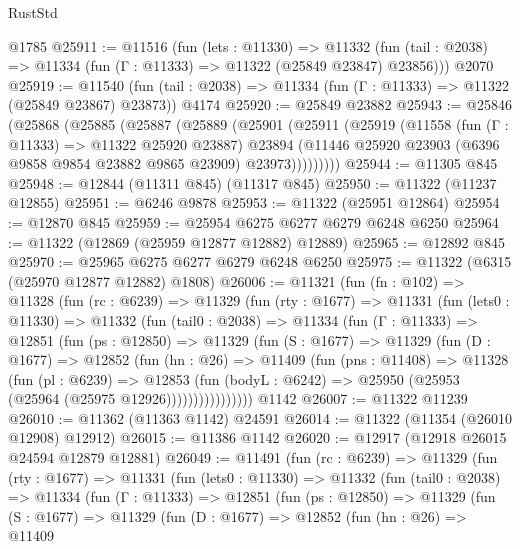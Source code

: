 \begin{lexlean}{RustStd}
\begin{coremodule}
    @1785
@25911 := @11516
    (fun (lets : @11330) =>
    @11332 (fun (tail : @2038) => @11334 (fun (Γ : @11333) => @11322 (@25849 @23847) @23856)))
    @2070
@25919 := @11540
    (fun (tail : @2038) => @11334 (fun (Γ : @11333) => @11322 (@25849 @23867) @23873))
    @4174
@25920 := @25849 @23882
@25943 := @25846
    (@25868
      (@25885
        (@25887
          (@25889
            (@25901
              (@25911
                (@25919
                  (@11558
                    (fun (Γ : @11333) => @11322 @25920 @23887)
                    @23894
                    (@11446 @25920 @23903 (@6396 @9858 @9854 @23882 @9865 @23909) @23973)))))))))
@25944 := @11305 @845
@25948 := @12844 (@11311 @845) (@11317 @845)
@25950 := @11322 (@11237 @12855)
@25951 := @6246 @9878
@25953 := @11322 (@25951 @12864)
@25954 := @12870 @845
@25959 := @25954 @6275 @6277 @6279 @6248 @6250
@25964 := @11322 (@12869 (@25959 @12877 @12882) @12889)
@25965 := @12892 @845
@25970 := @25965 @6275 @6277 @6279 @6248 @6250
@25975 := @11322 (@6315 (@25970 @12877 @12882) @1808)
@26006 := @11321
    (fun (fn : @102) =>
    @11328
      (fun (rc : @6239) =>
      @11329
        (fun (rty : @1677) =>
        @11331
          (fun (lets0 : @11330) =>
          @11332
            (fun (tail0 : @2038) =>
            @11334
              (fun (Γ : @11333) =>
              @12851
                (fun (ps : @12850) =>
                @11329
                  (fun (S : @1677) =>
                  @11329
                    (fun (D : @1677) =>
                    @12852
                      (fun (hn : @26) =>
                      @11409
                        (fun (pns : @11408) =>
                        @11328
                          (fun (pl : @6239) =>
                          @12853
                            (fun (bodyL : @6242) =>
                            @25950 (@25953 (@25964 (@25975 @12926))))))))))))))))
    @1142
@26007 := @11322 @11239
@26010 := @11362 (@11363 @1142) @24591
@26014 := @11322 (@11354 (@26010 @12908) @12912)
@26015 := @11386 @1142
@26020 := @12917 (@12918 @26015 @24594 @12879 @12881)
@26049 := @11491
    (fun (rc : @6239) =>
    @11329
      (fun (rty : @1677) =>
      @11331
        (fun (lets0 : @11330) =>
        @11332
          (fun (tail0 : @2038) =>
          @11334
            (fun (Γ : @11333) =>
            @12851
              (fun (ps : @12850) =>
              @11329
                (fun (S : @1677) =>
                @11329
                  (fun (D : @1677) =>
                  @12852
                    (fun (hn : @26) =>
                    @11409

\end{coremodule}
\end{lexlean}
